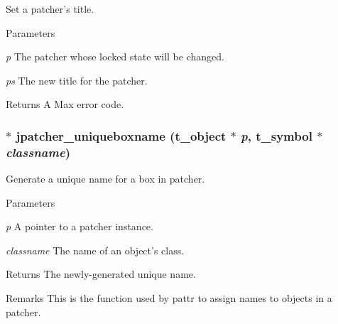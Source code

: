 Set a patcher's title. 
\begin{DoxyParams}{Parameters}
\item[{\em p}]The patcher whose locked state will be changed. \item[{\em ps}]The new title for the patcher. \end{DoxyParams}
\begin{DoxyReturn}{Returns}
A Max error code. 
\end{DoxyReturn}
\hypertarget{group__jpatcher_ga8538a0402d6936dd0838a52b4d43c56a}{
\subsubsection[{jpatcher\_\-uniqueboxname}]{$\ast$ jpatcher\_\-uniqueboxname ({\bf t\_\-object} $\ast$ {\em p}, \/  {\bf t\_\-symbol} $\ast$ {\em classname})}}
\label{group__jpatcher_ga8538a0402d6936dd0838a52b4d43c56a}


Generate a unique name for a box in patcher. 
\begin{DoxyParams}{Parameters}
\item[{\em p}]A pointer to a patcher instance. \item[{\em classname}]The name of an object's class. \end{DoxyParams}
\begin{DoxyReturn}{Returns}
The newly-\/generated unique name. 
\end{DoxyReturn}
\begin{DoxyRemark}{Remarks}
This is the function used by pattr to assign names to objects in a patcher. 
\end{DoxyRemark}
